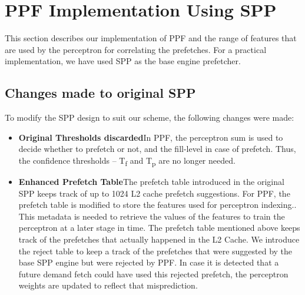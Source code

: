 \section{PPF Implementation Using SPP}
\label{Impl}

This section describes our implementation of PPF and the range of
features that are used by the perceptron for correlating the
prefetches.  For a practical implementation, we have used SPP as the
base engine prefetcher.

\subsection{Changes made to original SPP}
\label{Impl-Changes}
To modify the SPP design to suit our scheme, the following changes
were made:

\begin{itemize}
\item \textbf{Original Thresholds discarded}\newline In PPF, the
  perceptron sum is used to decide whether to prefetch or not, and the
  fill-level in case of prefetch.  Thus, the confidence thresholds --
  T\textsubscript{f} and T\textsubscript{p} are no longer needed.



\item \textbf{Enhanced Prefetch Table}\newline The prefetch table
  introduced in the original SPP keeps track of up to 1024 L2 cache
  prefetch suggestions.  For PPF, the prefetch table is modified to
  store the features used for perceptron indexing..
  This metadata is needed to retrieve the
  values of the features to train the perceptron at a later stage in
  time. The prefetch table mentioned above keeps track of the
  prefetches that actually happened in the L2 Cache.  We introduce the
  reject table to keep a track of the prefetches that were suggested
  by the base SPP engine but were rejected by PPF.  In case it is
  detected that a future demand fetch could have used this rejected
  prefetch, the perceptron weights are updated to reflect that
  misprediction.
\end{itemize}


